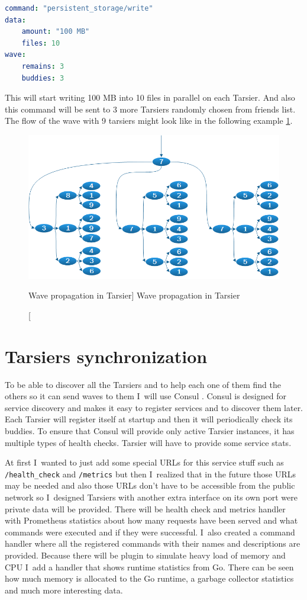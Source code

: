 \begin{lstlisting}[language=yaml,caption=Command 'write' body structure]
command: "persistent_storage/write"
data:
    amount: "100 MB"
    files: 10
wave: 
    remains: 3
    buddies: 3
\end{lstlisting}
 
This will start writing 100 MB into 10 files in parallel on each Tarsier. And also this command will be sent to 3 more Tarsiers randomly chosen from friends list. The flow of the wave with 9 tarsiers might look like in the following example \ref{fig:tarsier-wave}. 
                
\begin{figure}[htb]\centering
  \includegraphics[width=1\textwidth]{images/wave.png}
  \caption
    [Wave propagation in Tarsier]
    {Wave propagation in Tarsier}
  \label{fig:tarsier-wave}
\end{figure}

\section{Tarsiers synchronization}
To be able to discover all the Tarsiers and to help each one of them find the others so it can send waves to them I~will use Consul \cite{consul}. Consul is designed for service discovery and makes it easy to register services and to discover them later. Each Tarsier will register itself at startup and then it will periodically check its buddies. To ensure that Consul will provide only active Tarsier instances, it has multiple types of health checks. Tarsier will have to provide some service stats.

At first I~wanted to just add some special URLs for this service stuff such as \lstinline{/health_check} and \lstinline{/metrics} but then I~realized that in the future those URLs may be needed and also those URLs don’t have to be accessible from the public network so I~designed Tarsiers with another extra interface on its own port were private data will be provided. There will be health check and metrics handler with Prometheus statistics about how many requests have been served and what commands were executed and if they were successful. I~also created a command handler where all the registered commands with their names and descriptions are provided. Because there will be plugin to simulate heavy load of memory and CPU I~add a handler that shows runtime statistics from Go. There can be seen how much memory is allocated to the Go runtime, a garbage collector statistics and much more interesting data.

